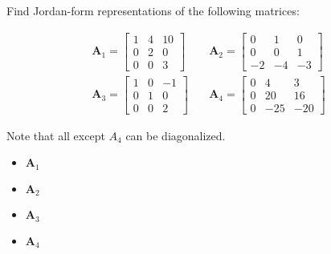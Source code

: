 \item [3.13] Find Jordan-form representations of the following matrices:

\begin{align*}
 \mathbf{A}_1 = \begin{bmatrix}
      1 & 4 & 10 \\
      0 & 2 & 0 \\
      0 & 0 & 3
     \end{bmatrix}
& \quad
\mathbf{A}_2 = \begin{bmatrix}
       0 & 1 & 0 \\
       0 & 0 & 1 \\
       -2 & -4 & -3
      \end{bmatrix}
\\
\mathbf{A}_3 = \begin{bmatrix}
       1 & 0 & -1 \\
       0 & 1 & 0 \\
       0 & 0 & 2
      \end{bmatrix}
& \quad
\mathbf{A}_4 = \begin{bmatrix}
       0 & 4 & 3\\
       0 & 20 & 16\\
       0 & -25 & -20
      \end{bmatrix}
\end{align*}

Note that all except $A_4$ can be diagonalized.


\begin{itemize}
 \item $\mathbf{A}_1$
 \item $\mathbf{A}_2$
 \item $\mathbf{A}_3$
 \item $\mathbf{A}_4$
\end{itemize}
